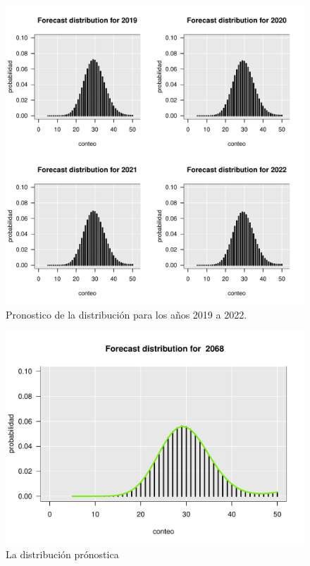\documentclass[a4paper]{article}\usepackage[]{graphicx}\usepackage[]{color}
\makeatletter
\def\maxwidth{ %
  \ifdim\Gin@nat@width>\linewidth
    \linewidth
  \else
    \Gin@nat@width
  \fi
}
\newenvironment{knitrout}{}{} %
\makeatother
\begin{document}
\begin{knitrout}
\color{fgcolor}\begin{figure}
\includegraphics[width=\maxwidth]{figure/unnamed-chunk-21-1} \caption[Pronostico de la distribución para los años 2019 a 2022]{Pronostico de la distribución para los años 2019 a 2022.}\label{fig:unnamed-chunk-21}
\end{figure}


\end{knitrout}


\begin{knitrout}
\color{fgcolor}\begin{figure}
\includegraphics[width=\maxwidth]{figure/unnamed-chunk-22-1} \caption[La distribución prónostica]{La distribución prónostica}\label{fig:unnamed-chunk-22}
\end{figure}


\end{knitrout}
\end{document}
